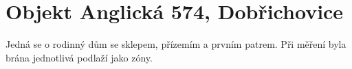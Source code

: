 \section{Objekt Anglická 574, Dobřichovice}
Jedná se o rodinný dům se sklepem, přízemím a prvním patrem. Při měření byla brána jednotlivá podlaží jako zóny. 




